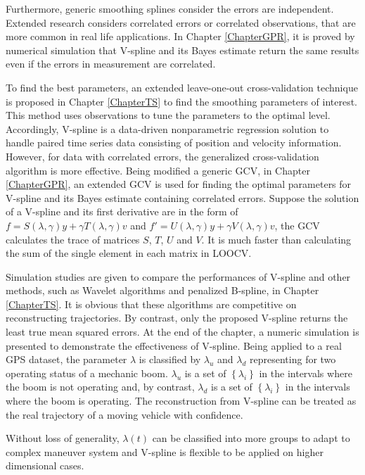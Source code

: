 Furthermore, generic smoothing splines consider the errors are independent. Extended research considers correlated errors or correlated observations, that are more common in real life applications. In Chapter \ref{ChapterGPR}, it is proved by numerical simulation that V-spline and its Bayes estimate return the same results even if the errors in measurement are correlated. 

To find the best parameters, an extended leave-one-out cross-validation technique is proposed in Chapter \ref{ChapterTS} to find the smoothing parameters of interest. This method uses observations to tune the parameters to the optimal level. Accordingly, V-spline is a data-driven nonparametric regression solution to handle paired time series data consisting of position and velocity information. However, for data with correlated errors, the generalized cross-validation algorithm is more effective. Being modified a generic GCV, in Chapter \ref{ChapterGPR}, an extended GCV is used for finding the optimal parameters for V-spline and its Bayes estimate containing correlated errors. Suppose the solution of a V-spline and its first derivative are in the form of $f=S(\lambda,\gamma)y+\gamma T(\lambda,\gamma)v$ and $f'=U(\lambda,\gamma)y+\gamma V(\lambda,\gamma)v$, the GCV calculates the trace of matrices $S$, $T$, $U$ and $V$. It is much faster than calculating the sum of the single element in each matrix in LOOCV. 

Simulation studies are given to compare the performances of V-spline and other methods, such as Wavelet algorithms and penalized B-spline, in Chapter \ref{ChapterTS}. It is obvious that these algorithms are competitive on reconstructing trajectories. By contrast, only the proposed V-spline returns the least true mean squared errors. At the end of the chapter, a numeric simulation is presented to demonstrate the effectiveness of V-spline. Being applied to a real GPS dataset, the parameter $\lambda$ is classified by $\lambda_u$ and $\lambda_d$ representing for two operating status of a mechanic boom. $\lambda_u$ is a set of $\left\lbrace\lambda_i\right\rbrace$ in the intervals where the boom is not operating and, by contrast, $\lambda_d$ is a set of $\left\lbrace\lambda_i\right\rbrace$ in the intervals where the boom is operating. The reconstruction from V-spline can be treated as the real trajectory of a moving vehicle with confidence. 

Without loss of generality, $\lambda(t)$ can be classified into more groups to adapt to complex maneuver system and V-spline is flexible to be applied on higher dimensional cases. 

